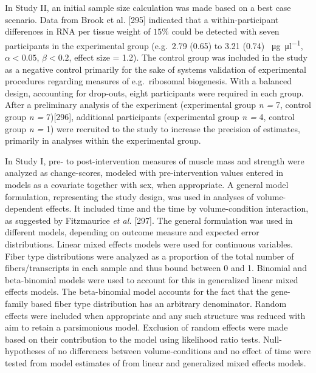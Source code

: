 \documentclass[twoside,10pt]{gihclass} %
\begin{document}
In Study II, an initial sample size calculation was made based on a best case scenario. Data from Brook et al. {[}295{]} indicated that a within-participant differences in RNA per tissue weight of \(15\%\) could be detected with seven participants in the experimental group (e.g.~2.79 (0.65) to 3.21 (0.74) \SI{}{\micro\gram\per\micro\litre}, \(\alpha<0.05\), \(\beta<0.2\), effect size = 1.2). The control group was included in the study as a negative control primarily for the sake of systems validation of experimental procedures regarding measures of e.g.~ribosomal biogenesis. With a balanced design, accounting for drop-outs, eight participants were required in each group. After a preliminary analysis of the experiment (experimental group \emph{n = }7, control group \emph{n = }7){[}296{]}, additional participants (experimental group \emph{n =} 4, control group \emph{n = }1) were recruited to the study to increase the precision of estimates, primarily in analyses within the experimental group.

In Study I, pre- to post-intervention measures of muscle mass and strength were analyzed as change-scores, modeled with pre-intervention values entered in models as a covariate together with sex, when appropriate.
A general model formulation, representing the study design, was used in analyses of volume-dependent effects. It included time and the time by volume-condition interaction, as suggested by Fitzmaurice \emph{et al.} {[}297{]}.
The general formulation was used in different models, depending on outcome measure and expected error distributions.
Linear mixed effects models were used for continuous variables.
Fiber type distributions were analyzed as a proportion of the total number of fibers/transcripts in each sample and thus bound between 0 and 1. Binomial and beta-binomial models were used to account for this in generalized linear mixed effects models.
The beta-binomial model accounts for the fact that the gene-family based fiber type distribution has an arbitrary denominator.
Random effects were included when appropriate and any such structure was reduced with aim to retain a parsimonious model. Exclusion of random effects were made based on their contribution to the model using likelihood ratio tests.
Null-hypotheses of no differences between volume-conditions and no effect of time were tested from model estimates of from linear and generalized mixed effects models.
\end{document}
